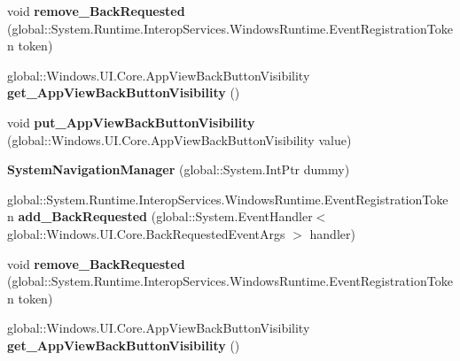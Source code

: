\begin{DoxyCompactItemize}
void {\bfseries remove\+\_\+\+Back\+Requested} (global\+::\+System.\+Runtime.\+Interop\+Services.\+Windows\+Runtime.\+Event\+Registration\+Token token)
\item 
\mbox{\label{class_windows_1_1_u_i_1_1_core_1_1_system_navigation_manager_a3aa076218316c5f742b0c8611394df04}} 
global\+::\+Windows.\+U\+I.\+Core.\+App\+View\+Back\+Button\+Visibility {\bfseries get\+\_\+\+App\+View\+Back\+Button\+Visibility} ()
\item 
\mbox{\label{class_windows_1_1_u_i_1_1_core_1_1_system_navigation_manager_afe04efb626cf6de6a695ea8debc94023}} 
void {\bfseries put\+\_\+\+App\+View\+Back\+Button\+Visibility} (global\+::\+Windows.\+U\+I.\+Core.\+App\+View\+Back\+Button\+Visibility value)
\item 
\mbox{\label{class_windows_1_1_u_i_1_1_core_1_1_system_navigation_manager_ae4d0015a9d24d73ac2ebcf8019f386b2}} 
{\bfseries System\+Navigation\+Manager} (global\+::\+System.\+Int\+Ptr dummy)
\item 
\mbox{\label{class_windows_1_1_u_i_1_1_core_1_1_system_navigation_manager_a505f794c14a0da8cd15a31aa6273a6d7}} 
global\+::\+System.\+Runtime.\+Interop\+Services.\+Windows\+Runtime.\+Event\+Registration\+Token {\bfseries add\+\_\+\+Back\+Requested} (global\+::\+System.\+Event\+Handler$<$ global\+::\+Windows.\+U\+I.\+Core.\+Back\+Requested\+Event\+Args $>$ handler)
\item 
\mbox{\label{class_windows_1_1_u_i_1_1_core_1_1_system_navigation_manager_abf606a807ad7581e8b10c99338d9221a}} 
void {\bfseries remove\+\_\+\+Back\+Requested} (global\+::\+System.\+Runtime.\+Interop\+Services.\+Windows\+Runtime.\+Event\+Registration\+Token token)
\item 
\mbox{\label{class_windows_1_1_u_i_1_1_core_1_1_system_navigation_manager_a3aa076218316c5f742b0c8611394df04}} 
global\+::\+Windows.\+U\+I.\+Core.\+App\+View\+Back\+Button\+Visibility {\bfseries get\+\_\+\+App\+View\+Back\+Button\+Visibility} ()

\end{DoxyCompactItemize}
